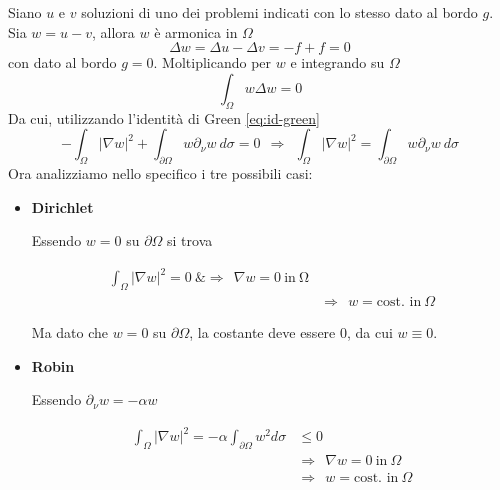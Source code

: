 \documentclass[10pt,a4paper,twoside,openright]{book}
\begin{document}
\begin{dimostrazione}
	Siano $\displaystyle u$ e $\displaystyle v$ soluzioni di uno dei problemi indicati con lo stesso dato al bordo $\displaystyle g$. Sia $\displaystyle w=u-v$, allora $\displaystyle w$ è armonica in $\displaystyle \Omega $
	\begin{equation*}
		\Delta w=\Delta u-\Delta v=-f+f=0
	\end{equation*}
	con dato al bordo $\displaystyle g=0$. Moltiplicando per $\displaystyle w$ e integrando su $\displaystyle \Omega $
	\begin{equation*}
		\int _{\Omega } w\Delta w=0
	\end{equation*}
	Da cui, utilizzando l'identità di Green \eqref{eq:id-green}
	\begin{equation*}
		-\int _{\Omega }| \nabla w| ^{2} +\int _{\partial \Omega } w\partial _{\nu } w\ d\sigma =0\ \ \Rightarrow \ \ \int _{\Omega }| \nabla w| ^{2} =\int _{\partial \Omega } w\partial _{\nu } w\ d\sigma 
	\end{equation*}
	Ora analizziamo nello specifico i tre possibili casi:
	\begin{itemize}
		\item \textbf{Dirichlet}
		      
		      Essendo $\displaystyle w=0$ su $\displaystyle \partial \Omega $ si trova
		      
		      \begin{align*}
		      	\int _{\Omega }| \nabla w| ^{2} =0\ \&\Rightarrow \ \ \nabla w=0\ \text{in} \ \mathrm{\Omega } &                                                          \\
		      	                                      & \Rightarrow \ \ w=\text{cost. in} \ \Omega               
		      \end{align*}
		      
		      Ma dato che $\displaystyle w=0$ su $\displaystyle \partial \Omega $, la costante deve essere $\displaystyle 0$, da cui $\displaystyle w\equiv 0$.
		\item \textbf{Robin}
		      
		      Essendo $\displaystyle \partial _{\nu } w=-\alpha w$
		      
		      \begin{align*}
		      	\int _{\Omega }| \nabla w| ^{2} =-\alpha \int _{\partial \Omega } w^{2} d\sigma & \leqslant 0                                    \\
		      	                                                                                & \Rightarrow \ \ \nabla w=0\ \text{in} \ \Omega \\
		      	                                                                                & \Rightarrow \ \ w=\text{cost. in} \ \Omega     
		      \end{align*}
		      

\end{itemize}
\end{dimostrazione}
\end{document}
